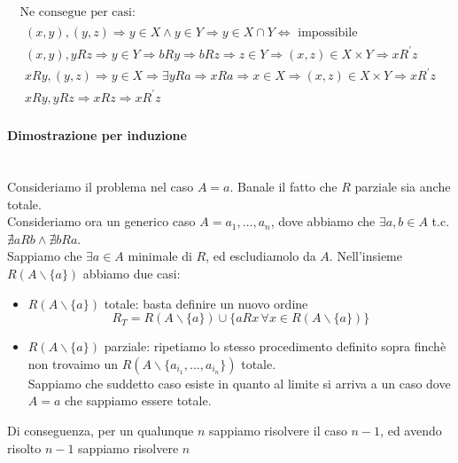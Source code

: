 \documentclass{report}
\newcommand{\subsubsubsection}[1]{\paragraph{#1}\mbox{}\\}
\begin{document}
$$\begin{array}{l}
                    \textrm{Ne consegue per casi:} \\
                    \begin{array}{l}
                        \left(x, y\right), \left(y, z\right) \Longrightarrow y \in X \wedge y \in Y \Longrightarrow y \in X \cap Y \Longleftrightarrow \textrm{ impossibile } \\
                        \left(x, y\right), yRz \Longrightarrow y \in Y \Longrightarrow bRy \Longrightarrow bRz \Longrightarrow z \in Y \Longrightarrow \left(x, z\right) \in X \times Y \Longrightarrow xR^{'}z \\
                        xRy, \left(y, z\right) \Longrightarrow y \in X \Longrightarrow \exists yRa \Longrightarrow xRa \Longrightarrow x \in X \Longrightarrow \left(x, z\right) \in X \times Y \Longrightarrow xR^{'}z \\
                        xRy, yRz \Longrightarrow xRz \Longrightarrow xR^{'}z
                    \end{array} 
                \end{array}$$
            \subsubsubsection{Dimostrazione per induzione}
                Consideriamo il problema nel caso $A = {a}$. Banale il fatto che $R$ parziale sia anche totale. \\
                Consideriamo ora un generico caso $A = {a_1, ..., a_n}$, dove abbiamo che $\exists a, b \in A$ t.c. $\nexists aRb \wedge \nexists bRa$. \\
                Sappiamo che $\exists a \in A$ minimale di $R$, ed escludiamolo da $A$.
                Nell'insieme $R\left(A \backslash \{a\}\right)$ abbiamo due casi:
                \begin{itemize}
                    \item $R\left(A \backslash \{a\}\right)$ totale: basta definire un nuovo ordine 
                        $$R_T = R\left(A \backslash \{a\}\right) \cup \{aRx \, \forall x \in R\left(A \backslash \{a\}\right)\}$$
                    \item $R\left(A \backslash \{a\}\right)$ parziale: ripetiamo lo stesso procedimento definito sopra 
                        finchè non trovaimo un $R\left(A \backslash \{a_{i_1}, ..., a_{i_n}\}\right)$ totale. \\
                        Sappiamo che suddetto caso esiste in quanto al limite si arriva a un caso dove $A = {a}$ che sappiamo essere totale.
                \end{itemize}
                Di conseguenza, per un qualunque $n$ sappiamo risolvere il caso $n-1$, ed avendo risolto $n-1$ sappiamo risolvere $n$
\end{document}
